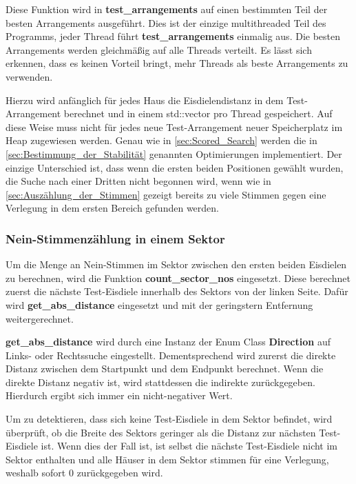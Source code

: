 \documentclass[a4paper,10pt,ngerman,captions=figureheading]{scrartcl}
\begin{document}
Diese Funktion wird in \textbf{test\_arrangements} auf einen bestimmten Teil der besten Arrangements ausgeführt.
Dies ist der einzige multithreaded Teil des Programms, jeder Thread führt \textbf{test\_arrangements} einmalig aus.
Die besten Arrangements werden gleichmäßig auf alle Threads verteilt.
Es lässt sich erkennen, dass es keinen Vorteil bringt, mehr Threads als beste Arrangements zu verwenden.

\medskip
Hierzu wird anfänglich für jedes Haus die Eisdielendistanz in dem Test-Arrangement berechnet und in einem std::vector pro Thread gespeichert.
Auf diese Weise muss nicht für jedes neue Test-Arrangement neuer Speicherplatz im Heap zugewiesen werden.
Genau wie in \autoref{sec:Scored_Search} werden die in \autoref{sec:Bestimmung_der_Stabilität} genannten Optimierungen implementiert.
Der einzige Unterschied ist, dass wenn die ersten beiden Positionen gewählt wurden, die Suche nach einer Dritten nicht begonnen wird, wenn wie in \autoref{sec:Auszählung_der_Stimmen} gezeigt bereits zu viele Stimmen gegen eine Verlegung in dem ersten Bereich gefunden werden.

\subsubsection{Nein-Stimmenzählung in einem Sektor}
\label{sec:Stimmenzählung_in_einem_Sektor}
Um die Menge an Nein-Stimmen im Sektor zwischen den ersten beiden Eisdielen zu berechnen, wird die Funktion \textbf{count\_sector\_nos} eingesetzt.
Diese berechnet zuerst die nächste Test-Eisdiele innerhalb des Sektors von der linken Seite.
Dafür wird \textbf{get\_abs\_distance} eingesetzt und mit der geringstern Entfernung weitergerechnet.

\medskip
\begin{addmargin}[3em]{4em}
    \textbf{get\_abs\_distance} wird durch eine Instanz der Enum Class \textbf{Direction} auf Links- oder Rechtssuche eingestellt.
    Dementsprechend wird zurerst die direkte Distanz zwischen dem Startpunkt und dem Endpunkt berechnet.
    Wenn die direkte Distanz negativ ist, wird stattdessen die indirekte zurückgegeben.
    Hierdurch ergibt sich immer ein nicht-negativer Wert.
\end{addmargin}

\medskip
Um zu detektieren, dass sich keine Test-Eisdiele in dem Sektor befindet, wird überprüft, ob die Breite des Sektors geringer als die Distanz zur nächsten Test-Eisdiele ist.
Wenn dies der Fall ist, ist selbst die nächste Test-Eisdiele nicht im Sektor enthalten und alle Häuser in dem Sektor stimmen für eine Verlegung, weshalb sofort $0$ zurückgegeben wird.
\end{document}
